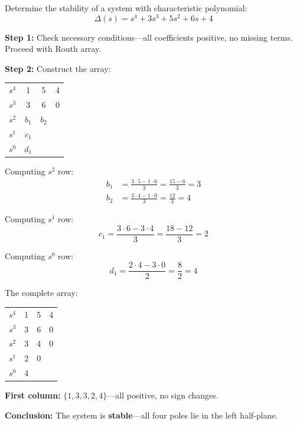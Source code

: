 \begin{example}
\label{ex:routh_complete}
Determine the stability of a system with characteristic polynomial:
\begin{equation}
\Delta(s) = s^4 + 3s^3 + 5s^2 + 6s + 4
\end{equation}

\textbf{Step 1:} Check necessary conditions---all coefficients positive, no missing terms. Proceed with Routh array.

\textbf{Step 2:} Construct the array:

\begin{center}
\begin{tabular}{c|ccc}
$s^4$ & 1 & 5 & 4 \\
$s^3$ & 3 & 6 & 0 \\
$s^2$ & $b_1$ & $b_2$ & \\
$s^1$ & $c_1$ & & \\
$s^0$ & $d_1$ & &
\end{tabular}
\end{center}

Computing $s^2$ row:
\begin{align}
b_1 &= \frac{3 \cdot 5 - 1 \cdot 6}{3} = \frac{15 - 6}{3} = 3 \\
b_2 &= \frac{3 \cdot 4 - 1 \cdot 0}{3} = \frac{12}{3} = 4
\end{align}

Computing $s^1$ row:
\begin{equation}
c_1 = \frac{3 \cdot 6 - 3 \cdot 4}{3} = \frac{18 - 12}{3} = 2
\end{equation}

Computing $s^0$ row:
\begin{equation}
d_1 = \frac{2 \cdot 4 - 3 \cdot 0}{2} = \frac{8}{2} = 4
\end{equation}

The complete array:
\begin{center}
\begin{tabular}{c|ccc}
$s^4$ & 1 & 5 & 4 \\
$s^3$ & 3 & 6 & 0 \\
$s^2$ & 3 & 4 & 0 \\
$s^1$ & 2 & 0 & \\
$s^0$ & 4 & &
\end{tabular}
\end{center}

\textbf{First column:} $\{1, 3, 3, 2, 4\}$---all positive, no sign changes.

\textbf{Conclusion:} The system is \textbf{stable}---all four poles lie in the left half-plane.
\end{example}

